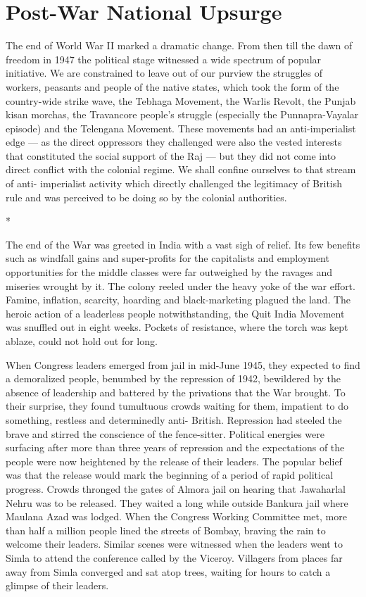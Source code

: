 \chapter{Post-War National Upsurge}



The end of World War II marked a dramatic change. From then till the dawn of freedom in 1947 the political stage witnessed a wide spectrum of popular initiative. We are constrained to leave out of our purview the struggles of workers, peasants and people of the native states, which took the form of the country-wide strike wave, the Tebhaga Movement, the Warlis Revolt, the Punjab kisan morchas, the Travancore people’s struggle (especially the Punnapra-Vayalar episode) and the Telengana Movement. These movements had an anti-imperialist edge — as the direct oppressors they challenged were also the vested interests that constituted the social support of the Raj — but they did not come into direct conflict with the colonial regime. We shall confine ourselves to that stream of anti- imperialist activity which directly challenged the legitimacy of British rule and was perceived to be doing so by the colonial authorities.

\begin{center}*\end{center}



The end of the War was greeted in India with a vast sigh of relief. Its few benefits such as windfall gains and super-profits for the capitalists and employment opportunities for the middle classes were far outweighed by the ravages and miseries wrought by it. The colony reeled under the heavy yoke of the war effort. Famine, inflation, scarcity, hoarding and black-marketing plagued the land. The heroic action of a leaderless people notwithstanding, the Quit India Movement was snuffled out in eight weeks. Pockets of resistance, where the torch was kept ablaze, could not hold out for long. 

When Congress leaders emerged from jail in mid-June 1945, they expected to find a demoralized people, benumbed by the repression of 1942, bewildered by the absence of leadership and battered by the privations that the War brought. To their surprise, they found tumultuous crowds waiting for them, impatient to do something, restless and determinedly anti- British. Repression had steeled the brave and stirred the conscience of the fence-sitter. Political energies were surfacing after more than three years of repression and the expectations of the people were now heightened by the release of their leaders. The popular belief was that the release would mark the beginning of a period of rapid political progress. Crowds thronged the gates of Almora jail on hearing that Jawaharlal Nehru was to be released. They waited a long while outside Bankura jail where Maulana Azad was lodged. When the Congress Working Committee met, more than half a million people lined the streets of Bombay, braving the rain to welcome their leaders. Similar scenes were witnessed when the leaders went to Simla to attend the conference called by the Viceroy. Villagers from places far away from Simla converged and sat atop trees, waiting for hours to catch a glimpse of their leaders. 

